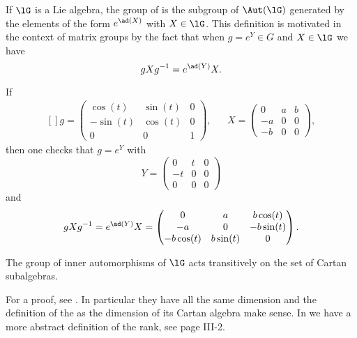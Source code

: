 If \( \lG\) is a Lie algebra, the group of  is the subgroup of \( \Aut(\lG)\) generated by the elements of the form \(  e^{\ad(X)}\) with \( X\in\lG\). This definition is motivated in the context of matrix groups by the fact that when \( g= e^{Y}\in G\) and \( X\in\lG\) we have
\begin{equation}
	gXg^{-1}= e^{\ad(Y)}X.
\end{equation}
\begin{example}
	If
	\begin{equation}
		\begin{aligned}[]
			g=\begin{pmatrix}
				  \cos(t)  & \sin(t) & 0 \\
				  -\sin(t) & \cos(t) & 0 \\
				  0        & 0       & 1
			  \end{pmatrix}, &  & X=\begin{pmatrix}
				                        0  & a & b \\
				                        -a & 0 & 0 \\
				                        -b & 0 & 0
			                        \end{pmatrix},
		\end{aligned}
	\end{equation}
	then one checks that \( g= e^{Y}\) with
	\begin{equation}
		Y=\begin{pmatrix}
			0  & t & 0 \\
			-t & 0 & 0 \\
			0  & 0 & 0
		\end{pmatrix}
	\end{equation}
	and
	\begin{equation}
		gXg^{-1}= e^{\ad(Y)}X=\begin{pmatrix}
			0         & a        & b\cos(t)  \\
			-a        & 0        & -b\sin(t) \\
			-b\cos(t) & b\sin(t) & 0
		\end{pmatrix}.
	\end{equation}
\end{example}

\begin{theorem}
	The group of inner automorphisms of \( \lG\) acts transitively on the set of Cartan subalgebras.
\end{theorem}

For a proof, see \cite{SerreSSAlgebres}. In particular they have all the same dimension and the definition of the  as the dimension of its Cartan algebra make sense. In \cite{SerreSSAlgebres} we have a more abstract definition of the rank, see page III-2.

